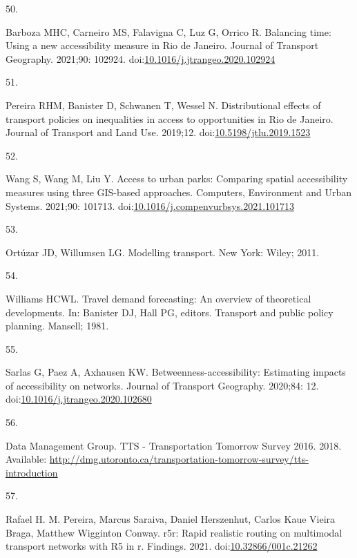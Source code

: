 \documentclass[10pt,letterpaper]{article}
\newlength{\cslhangindent}
\newlength{\csllabelwidth}
\newlength{\cslentryspacingunit} %
\newenvironment{CSLReferences}[2] %
 {%
  \setlength{\parindent}{0pt}
  \ifodd #1
  \let\oldpar\par
  \def\par{\hangindent=\cslhangindent\oldpar}
  \fi
  \setlength{\parskip}{#2\cslentryspacingunit}
 }%
 {}
\newcommand{\CSLLeftMargin}[1]{\parbox[t]{\csllabelwidth}{#1}}
\newcommand{\CSLRightInline}[1]{\parbox[t]{\linewidth - \csllabelwidth}{#1}\break}
\begin{document}
\begin{CSLReferences}{0}{0}
\leavevmode{}%
\CSLLeftMargin{50. }%
\CSLRightInline{Barboza MHC, Carneiro MS, Falavigna C, Luz G, Orrico R.
Balancing time: {Using} a new accessibility measure in {Rio} de
{Janeiro}. Journal of Transport Geography. 2021;90: 102924.
doi:\href{https://doi.org/10.1016/j.jtrangeo.2020.102924}{10.1016/j.jtrangeo.2020.102924}}

\leavevmode{}%
\CSLLeftMargin{51. }%
\CSLRightInline{Pereira RHM, Banister D, Schwanen T, Wessel N.
Distributional effects of transport policies on inequalities in access
to opportunities in {Rio} de {Janeiro}. Journal of Transport and Land
Use. 2019;12.
doi:\href{https://doi.org/10.5198/jtlu.2019.1523}{10.5198/jtlu.2019.1523}}

\leavevmode{}%
\CSLLeftMargin{52. }%
\CSLRightInline{Wang S, Wang M, Liu Y. Access to urban parks:
{Comparing} spatial accessibility measures using three {GIS}-based
approaches. Computers, Environment and Urban Systems. 2021;90: 101713.
doi:\href{https://doi.org/10.1016/j.compenvurbsys.2021.101713}{10.1016/j.compenvurbsys.2021.101713}}

\leavevmode{}%
\CSLLeftMargin{53. }%
\CSLRightInline{Ortúzar JD, Willumsen LG. Modelling transport. New York:
Wiley; 2011. }

\leavevmode{}%
\CSLLeftMargin{54. }%
\CSLRightInline{Williams HCWL. Travel demand forecasting: An overview of
theoretical developments. In: Banister DJ, Hall PG, editors. Transport
and public policy planning. Mansell; 1981. }

\leavevmode{}%
\CSLLeftMargin{55. }%
\CSLRightInline{Sarlas G, Paez A, Axhausen KW.
Betweenness-accessibility: Estimating impacts of accessibility on
networks. Journal of Transport Geography. 2020;84: 12.
doi:\href{https://doi.org/10.1016/j.jtrangeo.2020.102680}{10.1016/j.jtrangeo.2020.102680}}

\leavevmode{}%
\CSLLeftMargin{56. }%
\CSLRightInline{Data Management Group. {TTS} - {Transportation}
{Tomorrow} {Survey} 2016. 2018. Available:
\url{http://dmg.utoronto.ca/transportation-tomorrow-survey/tts-introduction}}

\leavevmode{}%
\CSLLeftMargin{57. }%
\CSLRightInline{Rafael H. M. Pereira, Marcus Saraiva, Daniel Herszenhut,
Carlos Kaue Vieira Braga, Matthew Wigginton Conway. r5r: Rapid realistic
routing on multimodal transport networks with R5 in r. Findings. 2021.
doi:\href{https://doi.org/10.32866/001c.21262}{10.32866/001c.21262}}


\end{CSLReferences}
\end{document}
